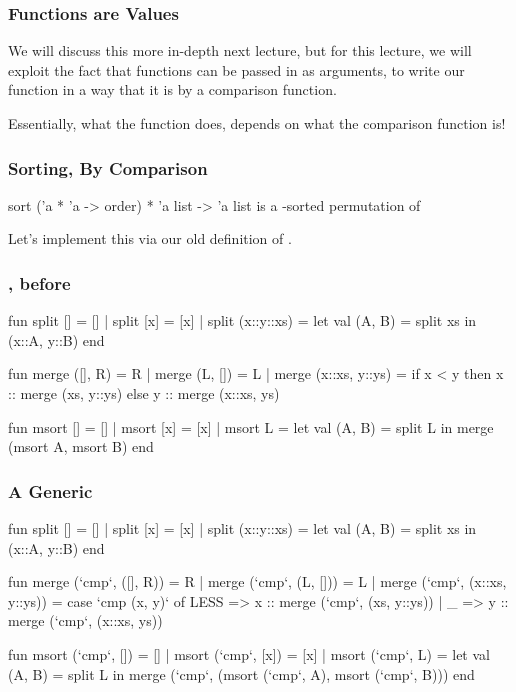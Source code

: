 \documentclass[aspectratio=169, handout]{beamer}
\begin{document}
\begin{frame}[fragile]
  \frametitle{Functions are Values}

  We will discuss this more in-depth next lecture, but for this lecture, we will
  exploit the fact that functions can be passed in as arguments, to write our
   function in a way that it is  by a comparison
  function.

  \pause
  \vspace{\fill}

  Essentially, what the  function does, depends on what the comparison
  function is!
\end{frame}

\begin{frame}[fragile]
  \frametitle{Sorting, By Comparison}

  \spec
    {sort}
    {('a * 'a -> order) * 'a list -> 'a list}
    {}
    { is a -sorted permutation of }

  \pause
  \vspace{\fill}

  Let's implement this via our old definition of .
\end{frame}

\begin{frame}[fragile]
  \frametitle{, before}
  {\tiny
  \begin{codeblock}
    fun split [] = []
      | split [x] = [x]
      | split (x::y::xs) = 
          let
            val (A, B) = split xs
          in
            (x::A, y::B)
          end

    fun merge ([], R) = R
      | merge (L, []) = L
      | merge (x::xs, y::ys) =
          if x < y then
            x :: merge (xs, y::ys)
          else
            y :: merge (x::xs, ys)

    fun msort [] = []
      | msort [x] = [x]
      | msort L = 
          let
            val (A, B) = split L 
          in
            merge (msort A, msort B) 
          end
  \end{codeblock}
  }
\end{frame}


\begin{frame}[fragile]
  \frametitle{A Generic }
  {\tiny
  \begin{codeblock}
    fun split [] = []
      | split [x] = [x]
      | split (x::y::xs) = 
          let
            val (A, B) = split xs
          in
            (x::A, y::B)
          end

    fun merge (`cmp`, ([], R)) = R
      | merge (`cmp`, (L, [])) = L
      | merge (`cmp`, (x::xs, y::ys)) =
          case `cmp (x, y)` of
            LESS => x :: merge (`cmp`, (xs, y::ys))
          | _ => y :: merge (`cmp`, (x::xs, ys))

    fun msort (`cmp`, []) = []
      | msort (`cmp`, [x]) = [x]
      | msort (`cmp`, L) = 
          let
            val (A, B) = split L 
          in
            merge (`cmp`, (msort (`cmp`, A), msort (`cmp`, B))) 
          end
  \end{codeblock}
  }
\end{frame}
\end{document}
